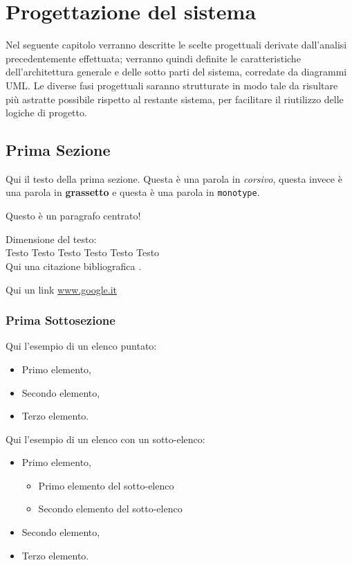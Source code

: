 \chapter{Progettazione del sistema}
Nel seguente capitolo verranno descritte le scelte progettuali derivate dall’analisi precedentemente effettuata; verranno quindi definite le caratteristiche dell’architettura generale e delle sotto parti del sistema, corredate da diagrammi UML.
Le diverse fasi progettuali saranno strutturate in modo tale da risultare più astratte possibile rispetto al restante sistema, per facilitare il riutilizzo delle logiche di progetto.

\section{Prima Sezione}
Qui il testo della prima sezione. Questa è  una parola in \textit{corsivo}, questa invece è una parola in \textbf{grassetto} e questa è una parola in \texttt{monotype}.

\begin{center}
Questo è un paragrafo centrato!
\end{center}

Dimensione del testo:\\

\LARGE{Testo} \Large{Testo} \large{Testo} \normalsize{Testo} \small{Testo} \footnotesize{Testo}\\

Qui una citazione bibliografica \cite{bib001}.

Qui un link \url{www.google.it}


\subsection{Prima Sottosezione}

Qui l'esempio di un elenco puntato:

\begin{itemize}
\item Primo elemento,
\item Secondo elemento,
\item Terzo elemento.
\end{itemize}

Qui l'esempio di un elenco con un sotto-elenco:

\begin{itemize}
\item Primo elemento,
\begin{itemize}
\item Primo elemento del sotto-elenco
\item Secondo elemento del sotto-elenco
\end{itemize}
\item Secondo elemento,
\item Terzo elemento.
\end{itemize}


